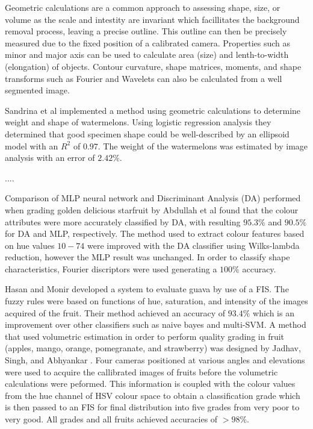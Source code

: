 \documentclass[fleqn,twoside]{article}
\begin{document}
Geometric calculations are a common approach to assessing shape, size, or volume as the scale and intestity are invariant which facillitates the background removal process, leaving a precise outline. This outline can then be precisely measured due to the fixed position of a calibrated camera. Properties such as minor and major axis can be used to calculate area (size) and lenth-to-width (elongation) of objects. Contour curvature, shape matrices, moments, and shape transforms such as Fourier and Wavelets can also be calculated from a well segmented image. 

Sandrina et al \cite{sandrina} implemented a method using geometric calculations to determine weight and shape of watermelons. Using logistic regression analysis they determined that good specimen shape could be well-described by an ellipsoid model with an $R^2$ of $0.97$. The weight of the watermelons was estimated by image analysis with an error of $2.42\%$.

....


Comparison of MLP neural network and Discriminant Analysis (DA) performed when grading golden delicious starfruit by Abdullah et al \cite{abdullah} found that the colour attributes were more accurately classified by DA, with resulting $95.3\%$ and $90.5\%$ for DA and MLP, respectively. The method used to extract colour features based on hue values $10-74$ were improved with the DA classifier using Wilks-lambda reduction, however the MLP result was unchanged. In order to classify shape characteristics, Fourier discriptors were used generating a $100\%$ accuracy.


Hasan and Monir \cite{hasan} developed a system to evaluate guava by use of a FIS. The fuzzy rules were based on functions of hue, saturation, and intensity of the images acquired of the fruit. Their method achieved an accuracy of $93.4\%$ which is an improvement over other classifiers such as naive bayes and multi-SVM. A method that used volumetric estimation in order to perform quality grading in fruit (apples, mango, orange, pomegranate, and strawberry) was designed by Jadhav, Singh, and Abhyankar \cite{jadhav}. Four cameras positioned at various angles and elevations were used to acquire the callibrated images of fruits before the volumetric calculations were peformed. This information is coupled with the colour values from the hue channel of HSV colour space to obtain a classification grade which is then passed to an FIS for final distribution into five grades from very poor to very good. All grades and all fruits achieved accuracies of $>98\%$. 
\end{document}
